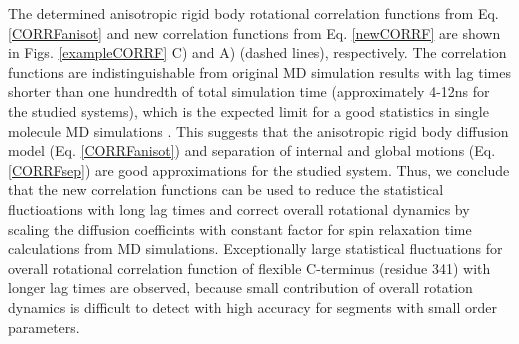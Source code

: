 \documentclass[pre,aps,floatfix,authordate1-4,twocolumn]{revtex4-1}
\begin{document}
The determined anisotropic rigid body rotational correlation functions
from Eq. \ref{CORRFanisot} and new correlation functions from Eq. \ref{newCORRF}
are shown in Figs. \ref{exampleCORRF} C) and A) (dashed lines), respectively.
The correlation functions are indistinguishable from original MD simulation results
with lag times shorter than one hundredth of total simulation time (approximately 4-12ns for the studied systems),
which is the expected limit for a good statistics in single molecule MD simulations \cite{lu06}.
This suggests that the anisotropic rigid body diffusion model (Eq. \ref{CORRFanisot}) and
separation of internal and global motions (Eq. \ref{CORRFsep}) are
good approximations for the studied system. Thus, we conclude that
the new correlation functions can be used to
reduce the statistical fluctioations with long lag times
and correct overall rotational dynamics by scaling the diffusion
coefficints with constant factor for 
spin relaxation time calculations from MD
simulations.
Exceptionally large statistical fluctuations for overall rotational correlation
function of flexible C-terminus (residue 341) with longer lag times are observed,
because small contribution of overall rotation dynamics is difficult
to detect with high accuracy for segments with small order parameters.



\end{document}
